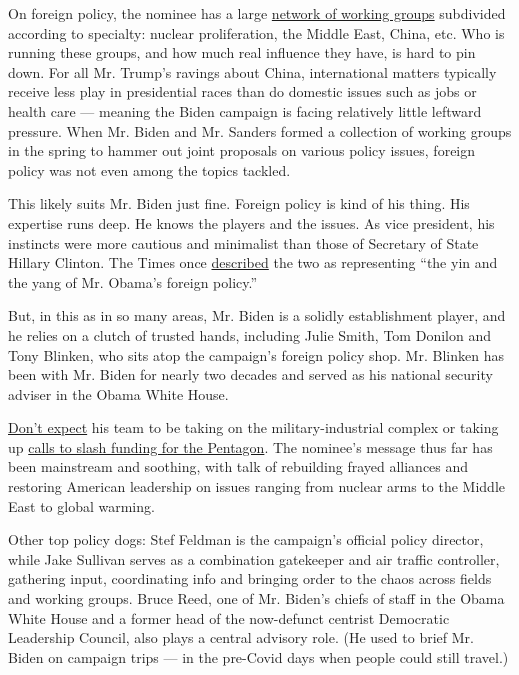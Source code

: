 On foreign policy, the nominee has a large
\href{https://www.theatlantic.com/ideas/archive/2020/05/bidens-grand-ambitions-dont-extend-foreign-policy/611863/}{network
of working groups} subdivided according to specialty: nuclear
proliferation, the Middle East, China, etc. Who is running these groups,
and how much real influence they have, is hard to pin down. For all Mr.
Trump's ravings about China, international matters typically receive
less play in presidential races than do domestic issues such as jobs or
health care --- meaning the Biden campaign is facing relatively little
leftward pressure. When Mr. Biden and Mr. Sanders formed a collection of
working groups in the spring to hammer out joint proposals on various
policy issues, foreign policy was not even among the topics tackled.

This likely suits Mr. Biden just fine. Foreign policy is kind of his
thing. His expertise runs deep. He knows the players and the issues. As
vice president, his instincts were more cautious and minimalist than
those of Secretary of State Hillary Clinton. The Times once
\href{https://www.nytimes.com/2015/10/10/us/politics/a-biden-run-would-expose-foreign-policy-differences-with-hillary-clinton.html}{described}
the two as representing ``the yin and the yang of Mr. Obama's foreign
policy.''

But, in this as in so many areas, Mr. Biden is a solidly establishment
player, and he relies on a clutch of trusted hands, including Julie
Smith, Tom Donilon and Tony Blinken, who sits atop the campaign's
foreign policy shop. Mr. Blinken has been with Mr. Biden for nearly two
decades and served as his national security adviser in the Obama White
House.

\href{https://www.theatlantic.com/ideas/archive/2020/05/bidens-grand-ambitions-dont-extend-foreign-policy/611863/}{Don't
expect} his team to be taking on the military-industrial complex or
taking up
\href{https://foreignpolicy.com/2020/05/11/biden-left-leaning-groups-slash-pentagon-budget/}{calls
to slash funding for the Pentagon}. The nominee's message thus far has
been mainstream and soothing, with talk of rebuilding frayed alliances
and restoring American leadership on issues ranging from nuclear arms to
the Middle East to global warming.

Other top policy dogs: Stef Feldman is the campaign's official policy
director, while Jake Sullivan serves as a combination gatekeeper and air
traffic controller, gathering input, coordinating info and bringing
order to the chaos across fields and working groups. Bruce Reed, one of
Mr. Biden's chiefs of staff in the Obama White House and a former head
of the now-defunct centrist Democratic Leadership Council, also plays a
central advisory role. (He used to brief Mr. Biden on campaign trips ---
in the pre-Covid days when people could still travel.)

